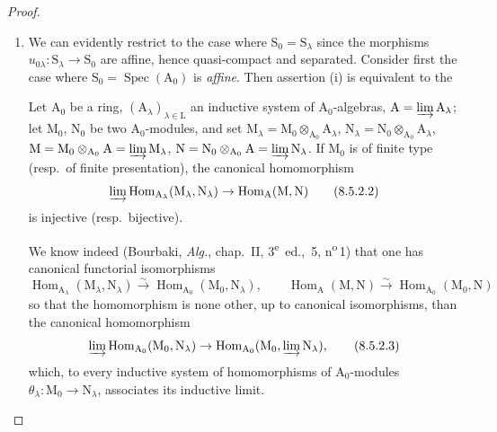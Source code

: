 \begin{proof}
\begin{enumerate}[label=(\roman*)]
  \item We can evidently restrict to the case where $\mathrm{S}_0=\mathrm{S}_\lambda$ since the morphisms $u_{0\lambda}:\mathrm{S}_\lambda\to\mathrm{S}_0$ are affine, hence quasi-compact and separated.
Consider first the case where $\mathrm{S}_0=\operatorname{Spec}(\mathrm{A}_0)$ is \emph{affine}.
Then assertion (i) is equivalent to the

\begin{lemma}[8.5.2.1]
\label{IV.8.5.2.1}
Let $\mathrm{A}_0$ be a ring, $(\mathrm{A}_\lambda)_{\lambda\in\mathrm{L}}$ an inductive system of $\mathrm{A}_0$-algebras, $\mathrm{A}=\varinjlim\mathrm{A}_\lambda$; let $\mathrm{M}_0$, $\mathrm{N}_0$ be two $\mathrm{A}_0$-modules, and set $\mathrm{M}_\lambda=\mathrm{M}_0\otimes_{\mathrm{A}_0}\mathrm{A}_\lambda$, $\mathrm{N}_\lambda=\mathrm{N}_0\otimes_{\mathrm{A}_0}\mathrm{A}_\lambda$, $\mathrm{M}=\mathrm{M}_0\otimes_{\mathrm{A}_0}\mathrm{A}=\varinjlim\mathrm{M}_\lambda$, $\mathrm{N}=\mathrm{N}_0\otimes_{\mathrm{A}_0}\mathrm{A}=\varinjlim\mathrm{N}_\lambda$.
If $\mathrm{M}_0$ is of finite type (\textup{resp.}\ of finite presentation), the canonical homomorphism
\begin{equation}
  \varinjlim\operatorname{Hom}_{\mathrm{A}_\lambda}(\mathrm{M}_\lambda,\mathrm{N}_\lambda)\to\operatorname{Hom}_\mathrm{A}(\mathrm{M},\mathrm{N})
  \tag{8.5.2.2}
\label{IV.8.5.2.2}
\end{equation}
is injective (\textup{resp.}\ bijective).
\end{lemma}

We know indeed (Bourbaki, \emph{Alg.}, chap.~II, 3\textsuperscript{e}~ed., \textsection\,5, n\textsuperscript{o}\,1) that one has canonical functorial isomorphisms
\[
  \operatorname{Hom}_{\mathrm{A}_\lambda}(\mathrm{M}_\lambda,\mathrm{N}_\lambda)\xrightarrow{\sim}\operatorname{Hom}_{\mathrm{A}_0}(\mathrm{M}_0,\mathrm{N}_\lambda),\qquad\operatorname{Hom}_\mathrm{A}(\mathrm{M},\mathrm{N})\xrightarrow{\sim}\operatorname{Hom}_{\mathrm{A}_0}(\mathrm{M}_0,\mathrm{N})
\]
so that the homomorphism  is none other, up to canonical isomorphisms, than the canonical homomorphism
\begin{equation}
  \varinjlim\operatorname{Hom}_{\mathrm{A}_0}(\mathrm{M}_0,\mathrm{N}_\lambda)\to\operatorname{Hom}_{\mathrm{A}_0}(\mathrm{M}_0,\varinjlim\mathrm{N}_\lambda),
  \tag{8.5.2.3}
\label{IV.8.5.2.3}
\end{equation}
which, to every inductive system of homomorphisms of $\mathrm{A}_0$-modules $\theta_\lambda:\mathrm{M}_0\to\mathrm{N}_\lambda$, associates its inductive limit.


\end{enumerate}
\end{proof}
